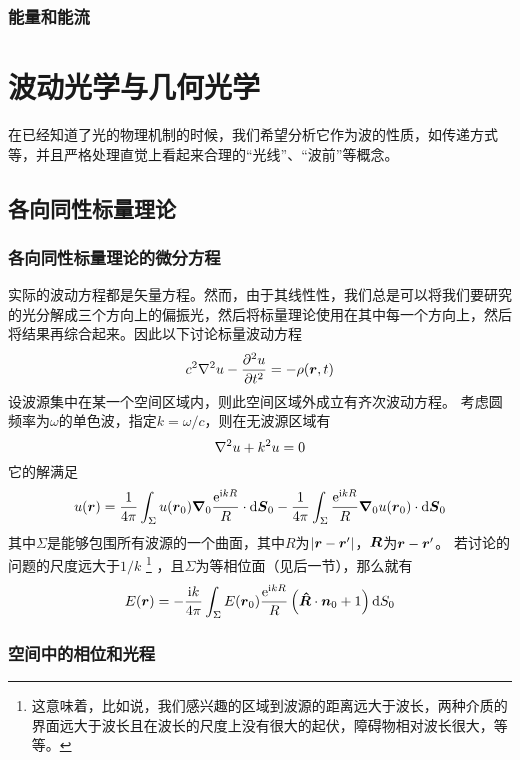 \documentclass[UTF8, a4paper]{ctexart}
\newcommand*{\ii}{\mathrm{i}}
\newcommand*{\ee}{\mathrm{e}}
\begin{document}
\subsubsection{能量和能流}

\section{波动光学与几何光学}

在已经知道了光的物理机制的时候，我们希望分析它作为波的性质，如传递方式等，并且严格处理直觉上看起来合理的“光线”、“波前”等概念。

\subsection{各向同性标量理论}\label{sec:isotropic-scalar}

\subsubsection{各向同性标量理论的微分方程}

实际的波动方程都是矢量方程。然而，由于其线性性，我们总是可以将我们要研究的光分解成三个方向上的偏振光，然后将标量理论使用在其中每一个方向上，然后将结果再综合起来。因此以下讨论标量波动方程
\[
    c^2 \laplacian u - \pdv[2]{u}{t} = - \rho(\vb*{r}, t)
\]
设波源集中在某一个空间区域内，则此空间区域外成立有齐次波动方程。
考虑圆频率为$\omega$的单色波，指定$k = \omega / c$，则在无波源区域有
\[
    \laplacian u + k^2 u = 0
\]
它的解满足
\[
    u(\vb*{r}) = 
    \frac{1}{4\pi} \int_{\Sigma} u(\vb*{r}_0) \grad_0{\frac{\ee^{\ii k R}}{R}} \cdot \dd \vb*{S}_0 
    - \frac{1}{4\pi} \int_{\Sigma} \frac{\ee^{\ii k R}}{R} \grad_0{u(\vb*{r}_0)} \cdot \dd{\vb*{S}_0}
\]
其中$\Sigma$是能够包围所有波源的一个曲面，其中$R$为$\abs{\vb*{r} - \vb*{r}'}$，$\vb*{R}$为$\vb*{r} - \vb*{r}'$。
若讨论的问题的尺度远大于$1/k$%
\footnote{这意味着，比如说，我们感兴趣的区域到波源的距离远大于波长，两种介质的界面远大于波长且在波长的尺度上没有很大的起伏，障碍物相对波长很大，等等。}
，且$\Sigma$为等相位面（见后一节），那么就有
\begin{equation}
    E(\vb*{r}) = - \frac{\ii k}{4\pi} \int_\Sigma E(\vb*{r}_0) \frac{\ee^{\ii k R}}{R} \left( \vu*{R} \cdot \vb*{n}_0 + 1 \right) \dd{S_0}
    \label{eq:kirchhoff-formula}
\end{equation}

\subsubsection{空间中的相位和光程}\label{sec:phrase-and-l}
\end{document}
